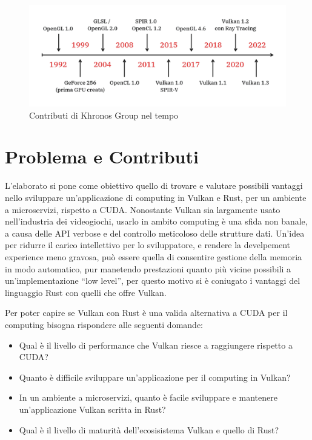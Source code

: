 \begin{figure}[ht]
    \centering
    \includegraphics[width=.9\linewidth]{images/chapter1/vulkan_history.png}
    \caption{Contributi di Khronos Group nel tempo}
    \label{fig:vulkan_history}
\end{figure}

\section[Problema e Contributi]{Problema e Contributi}


L'elaborato si pone come obiettivo quello di trovare e valutare possibili vantaggi nello sviluppare un'applicazione di computing in Vulkan e Rust, per un ambiente a microservizi, rispetto a CUDA.
Nonostante Vulkan sia largamente usato nell'industria dei videogiochi, usarlo in ambito computing è una sfida non banale, a causa delle API verbose e del controllo meticoloso delle strutture dati. 
Un'idea per ridurre il carico intellettivo per lo sviluppatore, e rendere la develpement experience meno gravosa, può essere quella di consentire gestione della memoria in modo automatico, pur manetendo prestazioni quanto più vicine possibili a un'implementazione ``low level'', per questo motivo si è coniugato i vantaggi del linguaggio Rust con quelli che offre Vulkan. 

Per poter capire se Vulkan con Rust è una valida alternativa a CUDA per il computing bisogna rispondere alle seguenti domande:

\begin{itemize}
    \item Qual è il livello di performance che Vulkan riesce a raggiungere rispetto a CUDA? 
    \item Quanto è difficile sviluppare un'applicazione per il computing in Vulkan?
    \item In un ambiente a microservizi, quanto è facile sviluppare e mantenere un'applicazione Vulkan scritta in Rust? 
    \item Qual è il livello di maturità dell'ecosisistema Vulkan e quello di Rust?
\end{itemize}

